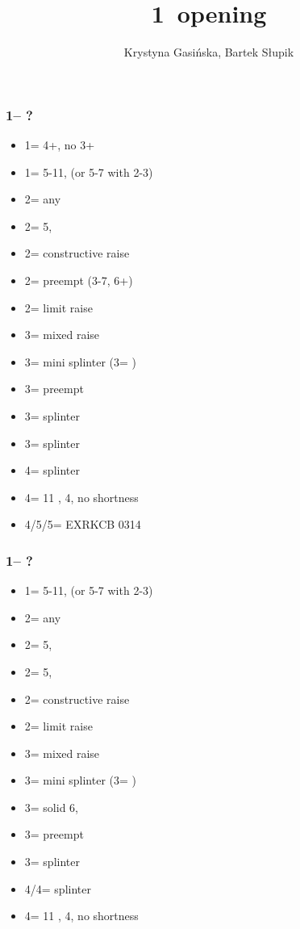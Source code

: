 \documentclass[12pt, a4paper]{article}
\title{1\major\ opening}
\author{Krystyna Gasińska, Bartek Słupik}
\begin{document}
\maketitle


\subsubsection*{1\hearts -- ?}
\begin{itemize}
    \item 1\spades = 4+\spades, no 3\hearts {}\hearts + \gf
    \item 1\nt = 5-11, (or 5-7 with 2-3\hearts)
    \item 2\clubs = any \gf
    \item 2\diams = 5\diams, \gf
    \item 2\hearts = constructive raise
    \item 2\spades = \spades preempt (3-7, 6+\spades)
    \item 2\nt = limit raise
    \item 3\clubs = mixed raise
    \item 3\diams = mini splinter (3\hearts = \lsf)
    \item 3\hearts = preempt
    \item 3\spades = splinter \spades
    \item 3\nt = splinter \diams
    \item 4\clubs = splinter \clubs
    \item 4\diams = 11 \hcp, 4\hearts, no shortness
    \item 4\spades/5\clubs/5\diams = EXRKCB 0314
\end{itemize}

\subsubsection*{1\spades -- ?}
\begin{itemize}
    \item 1\nt = 5-11, (or 5-7 with 2-3\spades)
    \item 2\clubs = any \gf
    \item 2\diams = 5\diams, \gf
    \item 2\hearts = 5\hearts, \gf
    \item 2\spades = constructive raise
    \item 2\nt = limit raise
    \item 3\clubs = mixed raise
    \item 3\diams = mini splinter (3\hearts = \lsf)
    \item 3\hearts = solid 6\hearts, \inv
    \item 3\spades = preempt
    \item 3\nt = splinter \hearts
    \item 4\clubs/4\diams = splinter
    \item 4\hearts = 11 \hcp, 4\spades, no shortness
\end{itemize}
\end{document}
